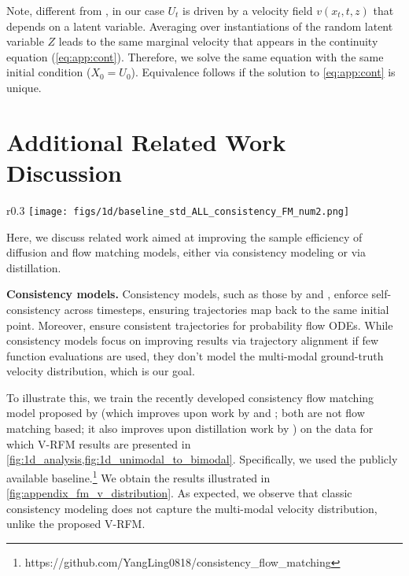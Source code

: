 Note, different from \citet{liu2023flow}, in our case $U_t$ is driven by a velocity field $v(x_t,t,z)$ that depends on a latent variable. 
Averaging over  instantiations of the random latent variable $Z$ leads to the 
same marginal velocity that appears in the continuity equation (\cref{eq:app:cont}). Therefore, we solve the same equation with the same initial condition ($X_0 = U_0$). Equivalence follows if the solution to \cref{eq:app:cont} is unique.


\section{Additional Related Work Discussion}
\label{app:addrel}




\begin{wrapfigure}{r}{0.3\textwidth}
    \vspace{-5mm}
    \centering
    \texttt{[image: figs/1d/baseline\_std\_ALL\_consistency\_FM\_num2.png]} %
    \vspace{-7mm}
    \label{fig:appendix_fm_v_distribution}
    \vspace{-1em}
\end{wrapfigure}
Here, we discuss related work aimed at improving the sample efficiency of diffusion and flow matching models, either via consistency modeling or via distillation. %




\noindent\textbf{Consistency models.} Consistency models, such as those by \citet{song2023consistency} and \citet{yang2024consistency}, enforce self-consistency across timesteps, ensuring trajectories map back to the same initial point. %
Moreover, \citet{kimconsistency} ensure consistent trajectories for probability flow ODEs. 
While consistency models focus on improving results via trajectory alignment if few function evaluations are used, they don't model the multi-modal ground-truth velocity distribution, which is our goal. %



To illustrate this, we train the recently developed consistency flow matching model proposed by \citet{yang2024consistency} (which improves upon work by \citet{song2023consistency} and \citet{kimconsistency}; both are not flow matching based; it also improves upon distillation work by \citet{nguyenbellman}) on the data for which V-RFM results are presented in \cref{fig:1d_analysis,fig:1d_unimodal_to_bimodal}. Specifically, we used the publicly available baseline.\footnote{https://github.com/YangLing0818/consistency\_flow\_matching} We obtain the results illustrated in \cref{fig:appendix_fm_v_distribution}. As expected, we observe that classic consistency modeling does not capture the multi-modal velocity distribution, unlike the proposed V-RFM.


